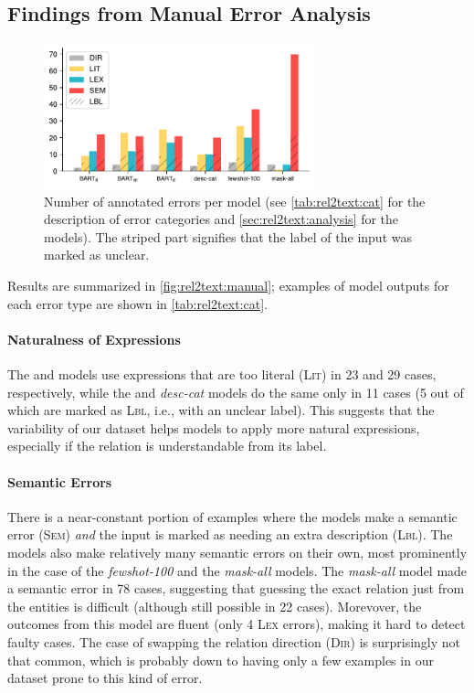 \subsection{Findings from Manual Error Analysis}
\begin{figure}[t]
    \centering
    \includegraphics[width=0.7\textwidth]{img/rel2text-graph.pdf}
    \caption{Number of annotated errors per model (see \autoref{tab:rel2text:cat} for the description of error categories and \autoref{sec:rel2text:analysis} for the models). The striped part signifies that the label of the input was marked as unclear.}
    \label{fig:rel2text:manual}
\end{figure}
Results are summarized in \autoref{fig:rel2text:manual}; examples of model outputs for each error type are shown in \autoref{tab:rel2text:cat}.

\paragraph{Naturalness of Expressions} The \BARTk{} and \BARTw{} models use expressions that are too literal (\textsc{Lit}) in 23 and 29 cases, respectively, while the \BARTr{} and \textit{desc-cat} models do the same only in 11 cases (5 out of which are marked as \textsc{Lbl}, i.e., with an unclear label). This suggests that the variability of our dataset helps models to apply more natural expressions, especially if the relation is understandable from its label.

\paragraph{Semantic Errors} There is a near-constant portion of examples where the models make a semantic error (\textsc{Sem}) \textit{and} the input is marked as needing an extra description (\textsc{Lbl}). The models also make relatively many semantic errors on their own, most prominently in the case of the \textit{fewshot-100} and the \textit{mask-all} models. The \textit{mask-all} model made a semantic error in 78 cases, suggesting that guessing the exact relation just from the entities is difficult (although still possible in 22 cases). Morevover, the outcomes from this model are fluent (only 4 \textsc{Lex} errors), making it hard to detect faulty cases.
The case of swapping the relation direction (\textsc{Dir}) is surprisingly not that common, which is probably down to having only a few examples in our dataset prone to this kind of error.

